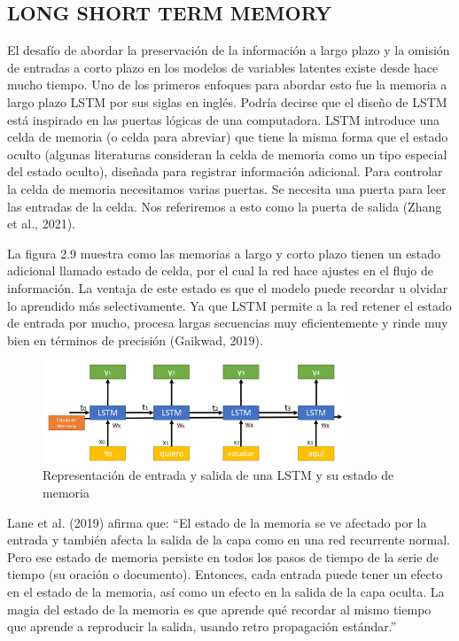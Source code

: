 \documentclass[letter, openright, 12pt]{book}
\begin{document}
\subsection{LONG SHORT TERM MEMORY}
El desafío de abordar la preservación de la información a largo plazo y la omisión de entradas a corto plazo en los modelos de variables latentes existe desde hace mucho tiempo. Uno de los primeros enfoques para abordar esto fue la memoria a largo plazo LSTM por sus siglas en inglés. Podría decirse que el diseño de LSTM está inspirado en las puertas lógicas de una computadora. LSTM introduce una celda de memoria (o celda para abreviar) que tiene la misma forma que el estado oculto (algunas literaturas consideran la celda de memoria como un tipo especial del estado oculto), diseñada para registrar información adicional. Para controlar la celda de memoria necesitamos varias puertas. Se necesita una puerta para leer las entradas de la celda. Nos referiremos a esto como la puerta de salida (Zhang et al., 2021).
\par
La figura 2.9 muestra como las memorias a largo y corto plazo tienen un estado adicional llamado estado de celda, por el cual la red hace ajustes en el flujo de información. La ventaja de este estado es que el modelo puede recordar u olvidar lo aprendido más selectivamente. Ya que LSTM permite a la red retener el estado de entrada por mucho, procesa largas secuencias muy eficientemente y rinde muy bien en términos de precisión (Gaikwad, 2019).


\begin{figure}[H]
\includegraphics[width=0.8\textwidth]{figura2_9}
\caption{Representación de entrada y salida de una LSTM y su estado de memoria }
\label{tab:figura2_9} 
\end{figure}

Lane et al. (2019) afirma que: “El estado de la memoria se ve afectado por la entrada y también afecta la salida de la capa como en una red recurrente normal. Pero ese estado de memoria persiste en todos los pasos de tiempo de la serie de tiempo (su oración o documento). Entonces, cada entrada puede tener un efecto en el estado de la memoria, así como un efecto en la salida de la capa oculta. La magia del estado de la memoria es que aprende qué recordar al mismo tiempo que aprende a reproducir la salida, usando retro propagación estándar.”
\end{document}
